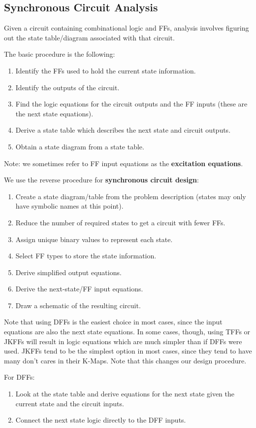 \documentclass[12pt]{article}
\begin{document}
\subsection*{Synchronous Circuit Analysis}
Given a circuit containing combinational logic and FFs, analysis involves figuring out the state table/diagram associated with that circuit.

The basic procedure is the following:
\begin{enumerate}
\item Identify the FFs used to hold the current state information.
\item Identify the outputs of the circuit.
\item Find the logic equations for the circuit outputs and the FF inputs (these are the next state equations).
\item Derive a state table which describes the next state and circuit outputs.
\item Obtain a state diagram from a state table.
\end{enumerate}
Note: we sometimes refer to FF input equations as the {\bf excitation equations}.

We use the reverse procedure for {\bf synchronous circuit design}:
\begin{enumerate}
\item Create a state diagram/table from the problem description (states may only have symbolic names at this point).
\item Reduce the number of required states to get a circuit with fewer FFs.
\item Assign unique binary values to represent each state.
\item Select FF types to store the state information.
\item Derive simplified output equations.
\item Derive the next-state/FF input equations.
\item Draw a schematic of the resulting circuit.
\end{enumerate}
Note that using DFFs is the easiest choice in most cases, since the input equations are also the next state equations. In some cases, though, using TFFs or JKFFs will result in logic equations which are much simpler than if DFFs were used. JKFFs tend to be the simplest option in most cases, since they tend to have many don't cares in their K-Maps. Note that this changes our design procedure.

For DFFs:
\begin{enumerate}
\item Look at the state table and derive equations for the next state given the current state and the circuit inputs.
\item Connect the next state logic directly to the DFF inputs.
\end{enumerate}
\end{document}
